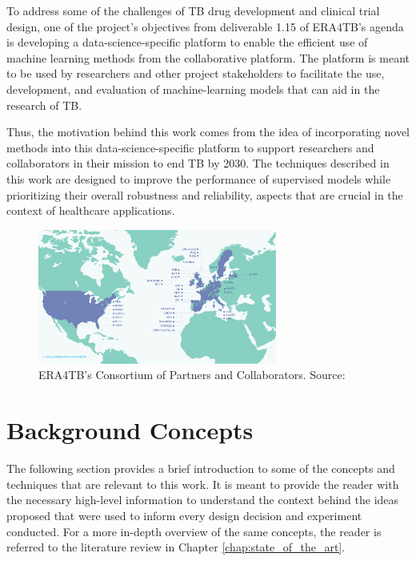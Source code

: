 \documentclass[../main.tex]{subfiles}
\begin{document}
    To address some of the challenges of TB drug development and clinical trial design, one of the project's objectives from deliverable 1.15 of ERA4TB's agenda is developing a data-science-specific platform to enable the efficient use of machine learning methods from the collaborative platform. The platform is meant to be used by researchers and other project stakeholders to facilitate the use, development, and evaluation of machine-learning models that can aid in the research of TB.

    Thus, the motivation behind this work comes from the idea of incorporating novel methods into this data-science-specific platform to support researchers and collaborators in their mission to end TB by 2030. The techniques described in this work are designed to improve the performance of supervised models while prioritizing their overall robustness and reliability, aspects that are crucial in the context of healthcare applications.

    \begin{figure}[H]
        \centering
        \includegraphics[width=0.7\textwidth]{figures/ERA4TB_map.png}
        \caption{ERA4TB's Consortium of Partners and Collaborators. Source: \cite{noauthor_era4tb}}
        \label{fig:era4tb}
    \end{figure}

    \section{Background Concepts} \label{sec:background}
    
    The following section provides a brief introduction to some of the concepts and techniques that are relevant to this work. It is meant to provide the reader with the necessary high-level information to understand the context behind the ideas proposed that were used to inform every design decision and experiment conducted. For a more in-depth overview of the same concepts, the reader is referred to the literature review in Chapter \ref{chap:state_of_the_art}.
\end{document}
